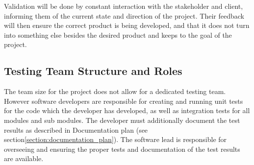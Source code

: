 Validation will be done by constant interaction with the stakeholder and client, informing them of the current state and direction of the project. Their feedback will then ensure the correct product is being developed, and that it does not turn into something else besides the desired product and keeps to the goal of the project.



\subsection{Testing Team Structure and Roles}

The team size for the project does not allow for a dedicated testing team. However software developers are responsible for creating and running unit tests for the code which the developer has developed, as well as integration tests for all modules and sub modules. The developer must additionally document the test results as described in Documentation plan (see section\:\ref{section:documentation_plan}). The software lead is responsible for overseeing and ensuring the proper tests and documentation of the test results are available.


